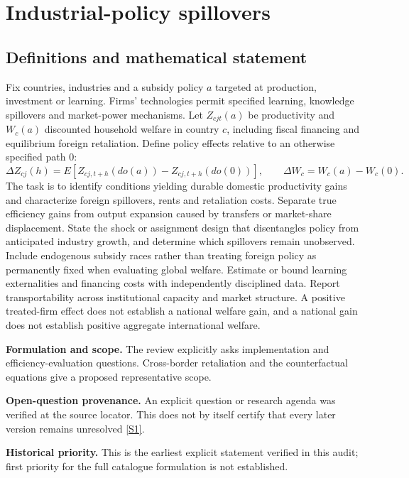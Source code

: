 \documentclass[11pt]{article}
\newcommand{\sref}[2]{\hyperlink{source:#1:#2}{[S#2]}}
\begin{document}
\section*{Industrial-policy spillovers}\label{30007628}
\subsection{Definitions and mathematical statement}
Fix countries, industries and a subsidy policy \(a\) targeted at production, investment or learning. Firms' technologies permit specified learning, knowledge spillovers and market-power mechanisms. Let \(Z_{cjt}(a)\) be productivity and \(W_c(a)\) discounted household welfare in country \(c\), including fiscal financing and equilibrium foreign retaliation. Define policy effects relative to an otherwise specified path \(0\):
\[\Delta Z_{cj}(h)=E[Z_{cj,t+h}(do(a))-Z_{cj,t+h}(do(0))],\qquad \Delta W_c=W_c(a)-W_c(0).\]
The task is to identify conditions yielding durable domestic productivity gains and characterize foreign spillovers, rents and retaliation costs. Separate true efficiency gains from output expansion caused by transfers or market-share displacement. State the shock or assignment design that disentangles policy from anticipated industry growth, and determine which spillovers remain unobserved. Include endogenous subsidy races rather than treating foreign policy as permanently fixed when evaluating global welfare. Estimate or bound learning externalities and financing costs with independently disciplined data. Report transportability across institutional capacity and market structure. A positive treated-firm effect does not establish a national welfare gain, and a national gain does not establish positive aggregate international welfare.

\par\textbf{Formulation and scope.} The review explicitly asks implementation and efficiency-evaluation questions. Cross-border retaliation and the counterfactual equations give a proposed representative scope.

\par\textbf{Open-question provenance.} An explicit question or research agenda was verified at the source locator. This does not by itself certify that every later version remains unresolved \sref{30007628}{1}.

\par\textbf{Historical priority.} This is the earliest explicit statement verified in this audit; first priority for the full catalogue formulation is not established.
\end{document}
